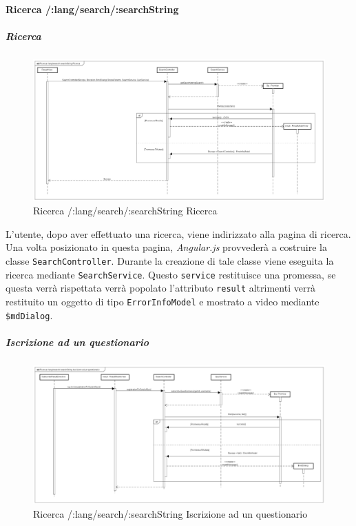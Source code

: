 \paragraph{Ricerca /:lang/search/:searchString}

\subparagraph{Ricerca}

\label{Ricerca /:lang/search/:searchString Ricerca}

\begin{figure}[ht]
	\centering
	\includegraphics[scale=0.275,keepaspectratio]{UML/DiagrammiDiSequenza/Front-end/Search.png}
	\caption{Ricerca /:lang/search/:searchString Ricerca}
\end{figure} \FloatBarrier

L'utente, dopo aver effettuato una ricerca, viene indirizzato alla pagina di ricerca. Una volta posizionato in questa pagina, \textit{Angular.js} provvederà a costruire la classe \texttt{SearchController}. Durante la creazione di tale classe viene eseguita la ricerca mediante \texttt{SearchService}. Questo \texttt{service} restituisce una promessa, se questa verrà rispettata verrà popolato l'attributo \texttt{result} altrimenti verrà restituito un oggetto di tipo \texttt{ErrorInfoModel} e mostrato a video mediante \texttt{\$mdDialog}.

\subparagraph{Iscrizione ad un questionario}

\label{Ricerca /:lang/search/:searchString Iscrizione ad un questionario}

\begin{figure}[ht]
	\centering
	\includegraphics[scale=0.275,keepaspectratio]{UML/DiagrammiDiSequenza/Front-end/Search_subscribeToQuiz.png}
	\caption{Ricerca /:lang/search/:searchString Iscrizione ad un questionario}
\end{figure} \FloatBarrier

